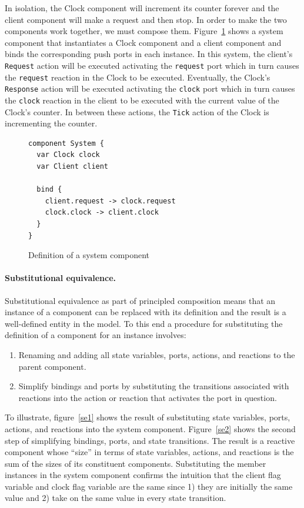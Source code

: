 In isolation, the Clock component will increment its counter forever and the client component will make a request and then stop.
In order to make the two components work together, we must compose them.
Figure~\ref{system_component} shows a system component that instantiates a Clock component and a client component and binds the corresponding push ports in each instance.
In this system, the client's \verb+Request+ action will be executed activating the \verb+request+ port which in turn causes the \verb+request+ reaction in the Clock to be executed.
Eventually, the Clock's \verb+Response+ action will be executed activating the \verb+clock+ port which in turn causes the \verb+clock+ reaction in the client to be executed with the current value of the Clock's counter.
In between these actions, the \verb+Tick+ action of the Clock is incrementing the counter.

\begin{figure}
\begin{verbatim}
component System {
  var Clock clock
  var Client client

  bind {
    client.request -> clock.request
    clock.clock -> client.clock
  }
}
\end{verbatim}
\caption{Definition of a system component\label{system_component}}
\end{figure}

\paragraph{Substitutional equivalence.}
Substitutional equivalence as part of principled composition means that an instance of a component can be replaced with its definition and the result is a well-defined entity in the model.
To this end a procedure for substituting the definition of a component for an instance involves:
\begin{enumerate}
\item Renaming and adding all state variables, ports, actions, and reactions to the parent component.
\item Simplify bindings and ports by substituting the transitions associated with reactions into the action or reaction that activates the port in question.
\end{enumerate}
To illustrate, figure~\ref{se1} shows the result of substituting state variables, ports, actions, and reactions into the system component.
Figure~\ref{se2} shows the second step of simplifying bindings, ports, and state transitions.
The result is a reactive component whose ``size'' in terms of state variables, actions, and reactions is the sum of the sizes  of its constituent components.
Substituting the member instances in the system component confirms the intuition that the client flag variable and clock flag variable are the same since 1) they are initially the same value and 2) take on the same value in every state transition.

